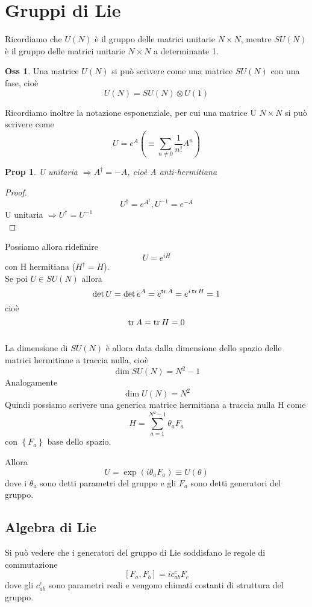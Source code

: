 \documentclass[10pt,a4paper]{article}
\newtheorem{prop}{Prop}[section]
\theoremstyle{definition}
\newtheorem{observation}{Oss}[section]
\begin{document}
\section{Gruppi di Lie}
Ricordiamo che $U(N)$ è il gruppo delle matrici unitarie $N\times N$, mentre $SU(N)$ è il gruppo delle matrici unitarie $N \times N$ a determinante 1.
\begin{observation}
    Una matrice $U(N)$ si può scrivere come una matrice $SU(N)$ con una fase, cioè
    \[
    U(N) = SU(N) \otimes U(1)    
    \]
\end{observation} 
Ricordiamo inoltre la notazione esponenziale, per cui una matrice U $N \times N$ si può scrivere come
\[
U = e^{A} \left( \equiv \sum_{n \neq 0} \frac{1}{n!} A^n \right)    
\]
\begin{prop}
    U unitaria $\Rightarrow A^\dagger = -A$, cioè A anti-hermitiana 
\end{prop}

\begin{proof}
    \[U^\dagger = e^{A^\dagger}, U^{-1} = e^{-A}\] U unitaria $\Rightarrow U^\dagger = U^{-1}$ \\
\end{proof}

Possiamo allora ridefinire 
\[U = e^{iH}\]
con H hermitiana ($H^\dagger = H$).
\\
Se poi $U \in SU(N)$ allora 
\[
\det U = \det e^A = e^{\tr A} = e^{i\tr H} = 1  
\]
cioè    
\[
    \tr A = \tr H = 0
\]
\\
La dimensione di $SU(N)$ è allora data dalla dimensione dello spazio delle matrici hermitiane a traccia nulla, cioè
\[
\dim SU(N) = N^2 - 1    
\]
Analogamente
\[
\dim U(N) = N^2    
\]
Quindi possiamo scrivere una generica matrice hermitiana a traccia nulla H come
\[
H = \sum_{a = 1}^{N^2 - 1} \theta_a F_a     
\]
con $\left\{ F_a  \right\}$ base dello spazio.

Allora
\[
U = \exp \left( i \theta_a F_a  \right) \equiv U(\theta)    
\]
dove i \(\theta_a \) sono detti parametri del gruppo e gli $F_a$ sono detti generatori del gruppo.

\subsection{Algebra di Lie}
Si può vedere che i generatori del gruppo di Lie soddisfano le regole di commutazione   
\[
    [F_a, F_b] = i c_{ab}^c F_c 
\]
dove gli $c_{ab}^c$ sono parametri reali e vengono chimati costanti di struttura del gruppo.
\end{document}
